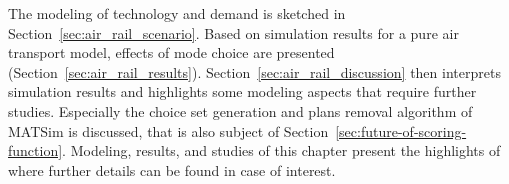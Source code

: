 The modeling of technology and demand is sketched in Section~\ref{sec:air_rail_scenario}. 
Based on simulation results for a pure air transport model, effects of mode choice are presented (Section~\ref{sec:air_rail_results}). 
Section~\ref{sec:air_rail_discussion} then interprets simulation results and highlights some modeling aspects that require further studies. 
Especially the choice set generation and plans removal algorithm of MATSim is discussed, that is also subject of Section~\ref{sec:future-of-scoring-function}. 
Modeling, results, and studies of this chapter present the highlights of \citet[][Chapter~6, pp.~119]{Grether2014PhD} where further details can be found in case of interest.   

%
%
%
